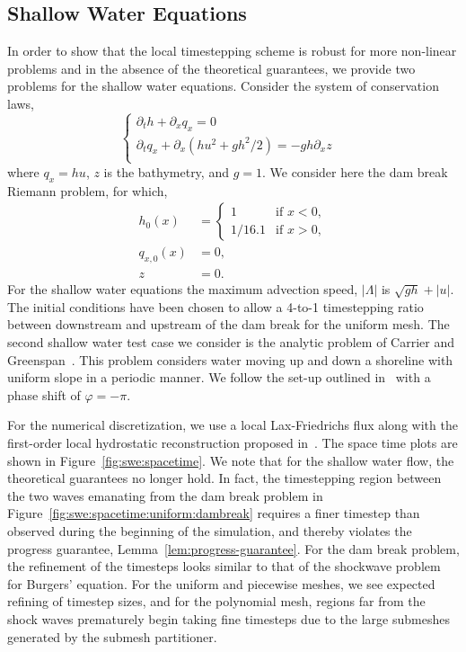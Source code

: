 \subsection{Shallow Water Equations}
In order to show that the local timestepping scheme is robust for more non-linear problems and in the absence of the theoretical guarantees, we provide two problems for the shallow water equations. Consider the system of conservation laws,
\begin{equation*}
  \begin{cases}
    \partial_t h + \partial_x q_x = 0 &\\
    \partial_t q_x + \partial_x ( hu^2 + gh^2/2) = -gh\partial_x z&\\
  \end{cases}
\end{equation*}
where $q_x = hu$, $z$ is the bathymetry, and $g=1$. We consider here the dam break Riemann problem, for which,
\begin{align*}
  h_0(x) &= \begin{cases}
    1 & \text{if } x < 0,\\
    1/16.1 & \text{if } x > 0,
  \end{cases}\\
  q_{x,0}(x) &= 0,\\
  z &= 0.
\end{align*}
For the shallow water equations the maximum advection speed, $|\Lambda|$ is  $\sqrt{gh} + |u|$. The initial conditions have been chosen to allow a 4-to-1 timestepping ratio between downstream and upstream of the dam break for the uniform mesh. The second shallow water test case we consider is the analytic problem of Carrier and Greenspan~\cite{Carrier1958}. This problem considers water moving up and down a shoreline with uniform slope in a periodic manner. We follow the set-up outlined in~\cite{Bokhove2005} with a phase shift of $\varphi=-\pi$.

For the numerical discretization, we use a local Lax-Friedrichs flux along with the first-order local hydrostatic reconstruction proposed in~\cite{Audusse2004}. The space time plots are shown in Figure~\ref{fig:swe:spacetime}.  We note that for the shallow water flow, the theoretical guarantees no longer hold. In fact, the timestepping region between the two waves emanating from the dam break problem in Figure~\ref{fig:swe:spacetime:uniform:dambreak} requires a finer timestep than observed during the beginning of the simulation, and thereby violates the progress guarantee, Lemma~\ref{lem:progress-guarantee}. For the dam break problem, the refinement of the timesteps looks similar to that of the shockwave problem for Burgers' equation. For the uniform and piecewise meshes, we see expected refining of timestep sizes, and for the polynomial mesh, regions far from the shock waves prematurely begin taking fine timesteps due to the large submeshes generated by the submesh partitioner.

